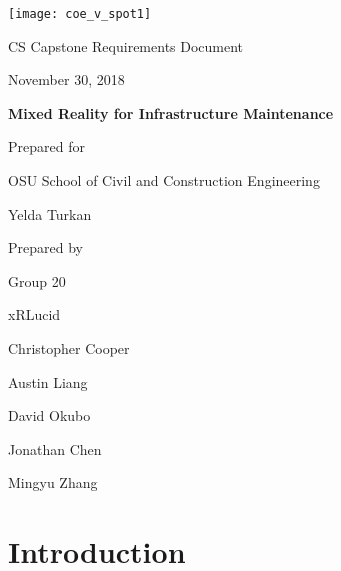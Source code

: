 \documentclass[onecolumn, draftclsnofoot,10pt, compsoc]{IEEEtran}
\def \CapstoneTeamName{		xRLucid}
\def \CapstoneTeamNumber{		20}
\def \GroupMemberOne{			Christopher Cooper}
\def \GroupMemberTwo{			Austin Liang}
\def \GroupMemberThree{			David Okubo}
\def \GroupMemberFour{			Jonathan Chen}
\def \GroupMemberFive{			Mingyu Zhang}
\def \CapstoneProjectName{		Mixed Reality for Infrastructure Maintenance}
\def \CapstoneSponsorCompany{	OSU School of Civil and Construction Engineering}
\def \CapstoneSponsorPerson{		Yelda Turkan}
\def \DocType{	%
				Requirements Document
				}
\newcommand{\NameSigPair}[1]{\par
\makebox[2.75in][r]{#1} \hfil 	\makebox[3.25in]{\makebox[2.25in]{\hrulefill} \hfill		\makebox[.75in]{\hrulefill}}
\par\vspace{-12pt} \textit{\tiny\noindent
\makebox[2.75in]{} \hfil		\makebox[3.25in]{\makebox[2.25in][r]{Signature} \hfill	\makebox[.75in][r]{Date}}}}
\renewcommand{\NameSigPair}[1]{#1}
\begin{document}
\begin{titlepage}
    \begin{singlespace}
    	\texttt{[image: coe\_v\_spot1]}
        \hfill 
        \par\vspace{.2in}
        \centering
        \scshape{
            \huge CS Capstone \DocType \par
            {\large November 30, 2018}\par
            \vspace{.5in}
            \textbf{\Huge\CapstoneProjectName}\par
            \vfill
            {\large Prepared for}\par
            \Huge \CapstoneSponsorCompany\par
            \vspace{5pt}
            {\Large\NameSigPair{\CapstoneSponsorPerson}\par}
            {\large Prepared by }\par
            Group\CapstoneTeamNumber\par
            \CapstoneTeamName\par 
            \vspace{5pt}
            {\Large
                \NameSigPair{\GroupMemberOne}\par
                \NameSigPair{\GroupMemberTwo}\par
                \NameSigPair{\GroupMemberThree}\par
                \NameSigPair{\GroupMemberFour}\par
                \NameSigPair{\GroupMemberFive}\par
            }
            \vspace{20pt}
        }

\end{singlespace}
\end{titlepage}
\newpage
{}
\tableofcontents
\listoffigures
\clearpage

\section{Introduction}
\end{document}
